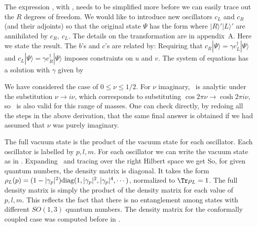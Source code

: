 The expression \ansentb , with \solex , needs to be simplified more before we can easily trace out the $R$
degrees of freedom. We would like to introduce new oscillators $c_L$ and $c_R$ (and their adjoints)
so that the original state $\Psi$ has the form
\eqn{}
 where $|R\rangle' |L \rangle'$
 are annihilated by $c_R, ~c_L$.
The details on the transformation are in appendix~A. Here we state the   result.
The $b$'s and $c$'s are related by:
\eqn{}
Requiring that $c_R|\Psi\rangle = \gamma c^\dagger_L |\Psi \rangle$ and $c_L|\Psi \rangle = \gamma c_R^\dagger|\Psi \rangle$ imposes constraints on $u$ and $v$.
The system of equations has a solution with  $\gamma$  given by
\eqn{}


We have considered the case of $0 \le \nu \le 1/2$. For $\nu$ imaginary, \eigen\ is analytic under the substitution $\nu \to i \nu$, which corresponds to substituting $\cos 2 \pi \nu \to \cosh 2 \pi  i \nu$, so \eigen\ is also valid for this range of masses.  One can check directly, by redoing all the steps in the
above derivation, that the same final answer is obtained if we had assumed that $\nu$ was
purely imaginary.



 The full vacuum state is the product of the vacuum state for each oscillator. Each oscillator is labelled
by $p,l,m$. For each oscillator we can write the vacuum state as in \finalc .
Expanding \finalc\ and tracing over the right Hilbert space we get
\eqn{}
So, for given quantum numbers, the density matrix is diagonal. It takes  the form
$\rho_L(p) = (1-|\gamma_p|^2)  {\rm diag}(1, |\gamma_p|^2, |\gamma_p|^4, \cdots) $, normalized to $\Tr\rho_L=1$.
The full density matrix is simply the product of the density matrix for each value of $p, l , m$. This
reflects the fact that there is no entanglement among states with different $SO(1,3)$ quantum numbers. The density matrix for the conformally coupled case was computed before in 
\NgXP . 

